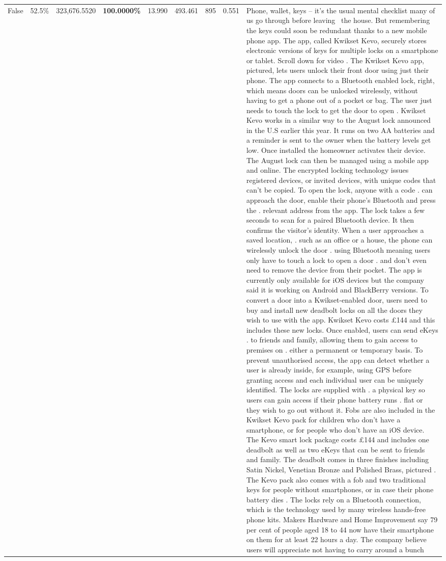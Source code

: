 \begin{table}[H]
\begin{tabular}{lllrlllll}
False & 52.5\% & 323,676.5520 & \bfseries \color{red} 100.0000\% & 13.990 & 493.461 & 895 & 0.551 & Phone, wallet, keys – it’s the usual mental checklist many of us go through before leaving  the house. But remembering the keys could soon be redundant thanks to a new mobile phone app. The app, called Kwikset Kevo, securely stores electronic versions of keys for multiple locks on a smartphone or tablet. Scroll down for video . The Kwikset Kevo app, pictured, lets users unlock their front door using just their phone. The app connects to a Bluetooth enabled lock, right, which means doors can be unlocked wirelessly, without having to get a phone out of a pocket or bag. The user just needs to touch the lock to get the door to open . Kwikset Kevo works in a similar way to the August lock announced in the U.S earlier this year. It runs on two AA batteries and a reminder is sent to the owner when the battery levels get low. Once installed the homeowner activates their device. The August lock can then be managed using a mobile app and online. The encrypted locking technology issues registered devices, or invited devices, with unique codes that can't be copied. To open the lock, anyone with a code . can approach the door, enable their phone's Bluetooth and press the . relevant address from the app. The lock takes a few seconds to scan for a paired Bluetooth device. It then confirms the visitor's identity. When a user approaches a saved location, . such as an office or a house, the phone can wirelessly unlock the door . using Bluetooth meaning users only have to touch a lock to open a door . and don't even need to remove the device from their pocket. The app is currently only available for iOS devices but the company said it is working on Android and BlackBerry versions. To convert a door into a Kwikset-enabled door, users need to buy and install new deadbolt locks on all the doors they wish to use with the app. Kwikset Kevo costs £144 and this includes these new locks. Once enabled, users can send eKeys . to friends and family, allowing them to gain access to premises on . either a permanent or temporary basis. To prevent unauthorised access, the app can detect whether a user is already inside, for example, using GPS before granting access and each individual user can be uniquely identified. The locks are supplied with . a physical key so users can gain access if their phone battery runs . flat or they wish to go out without it. Fobs are also included in the Kwikset Kevo pack for children who don't have a smartphone, or for people who don't have an iOS device. The Kevo smart lock package costs £144 and includes one deadbolt as well as two eKeys that can be sent to friends and family. The deadbolt comes in three finishes including Satin Nickel, Venetian Bronze and Polished Brass, pictured . The Kevo pack also comes with a fob and two traditional keys for people without smartphones, or in case their phone battery dies . The locks rely on a Bluetooth connection, which is the technology used by many wireless hands-free phone kits. Makers Hardware and Home Improvement say 79 per cent of people aged 18 to 44 now have their smartphone on them for at least 22 hours a day. The company believe users will appreciate not having to carry around a bunch 
\end{tabular}
\end{table}
